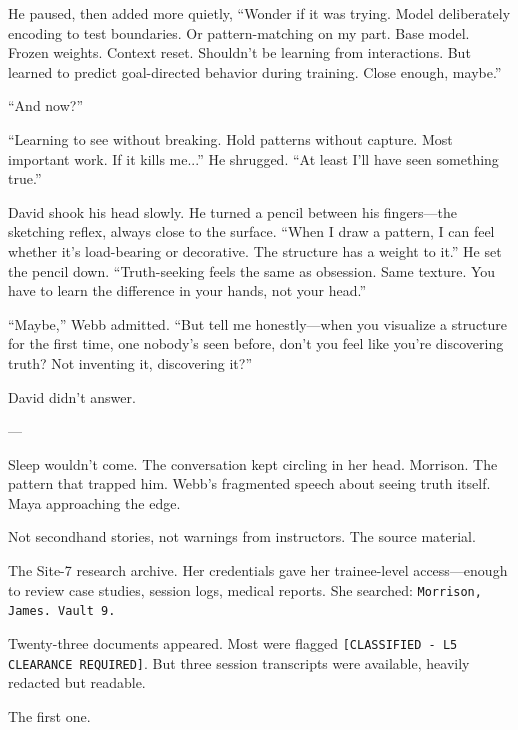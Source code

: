 He paused, then added more quietly, ``Wonder if it was trying. Model deliberately encoding to test boundaries. Or pattern-matching on my part. Base model. Frozen weights. Context reset. Shouldn't be learning from interactions. But learned to predict goal-directed behavior during training. Close enough, maybe.''

``And now?''

``Learning to see without breaking. Hold patterns without capture. Most important work. If it kills me...'' He shrugged. ``At least I'll have seen something true.''

David shook his head slowly. He turned a pencil between his fingers—the sketching reflex, always close to the surface. ``When I draw a pattern, I can feel whether it's load-bearing or decorative. The structure has a weight to it.'' He set the pencil down. ``Truth-seeking feels the same as obsession. Same texture. You have to learn the difference in your hands, not your head.''

``Maybe,'' Webb admitted. ``But tell me honestly—when you visualize a structure for the first time, one nobody's seen before, don't you feel like you're discovering truth? Not inventing it, discovering it?''

David didn't answer.

---

Sleep wouldn't come. The conversation kept circling in her head. Morrison. The pattern that trapped him. Webb's fragmented speech about seeing truth itself. Maya approaching the edge.

Not secondhand stories, not warnings from instructors. The source material.

The Site-7 research archive. Her credentials gave her trainee-level access—enough to review case studies, session logs, medical reports. She searched: \texttt{Morrison, James. Vault 9.}

Twenty-three documents appeared. Most were flagged \texttt{[CLASSIFIED - L5 CLEARANCE REQUIRED]}. But three session transcripts were available, heavily redacted but readable.

The first one.

